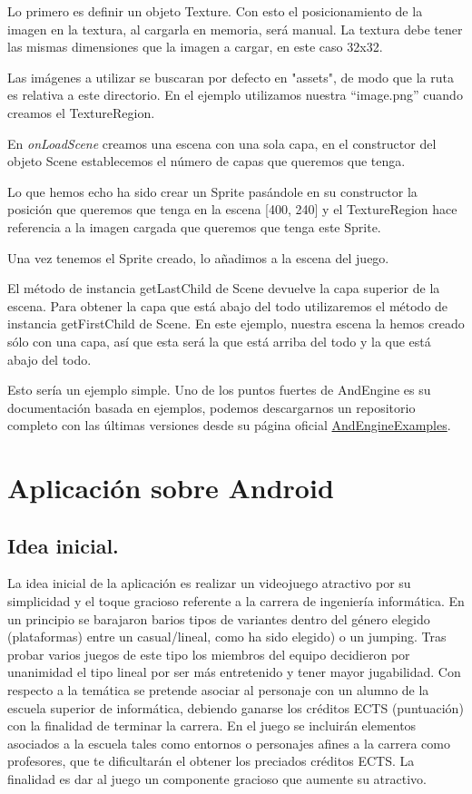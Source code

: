 \documentclass[12 pt, a4paper, twoside]{article}
\begin{document}
\clearpage
Lo primero es definir un objeto Texture. Con esto el posicionamiento
de la imagen en la textura, al cargarla en memoria, será manual.
La textura debe tener las mismas dimensiones que la imagen a cargar,
en este caso 32x32.

Las imágenes a utilizar se buscaran por defecto en "assets", de modo
que la ruta es relativa a este directorio. En el ejemplo utilizamos
nuestra ``image.png'' cuando creamos el TextureRegion.

En \emph{onLoadScene} creamos una escena con una sola capa, en el
constructor del objeto Scene establecemos el número de capas que
queremos que tenga.

Lo que hemos echo ha sido crear un Sprite pasándole en su constructor la posición que
queremos que tenga en la escena [400, 240] y el TextureRegion hace
referencia a la imagen cargada que queremos que tenga este Sprite.

Una vez tenemos el Sprite creado, lo añadimos a la escena del juego.

El método de instancia getLastChild de Scene devuelve la capa superior
de la escena. Para obtener la capa que está abajo del todo
utilizaremos el método de instancia getFirstChild de Scene. En este
ejemplo, nuestra escena la hemos creado sólo con una capa, así que
esta será la que está arriba del todo y la que está abajo del todo.

Esto sería un ejemplo simple. Uno de los puntos fuertes de AndEngine
es su documentación basada en ejemplos, podemos descargarnos un
repositorio completo con las últimas versiones desde su página oficial
\href{http://code.google.com/p/andengineexamples}{AndEngineExamples}.


\section{Aplicación sobre Android}%
\subsection{Idea inicial.}
La idea inicial de la aplicación es realizar un videojuego atractivo
por su simplicidad y el toque gracioso referente a la carrera de
ingeniería informática.
En un principio se barajaron barios tipos de variantes dentro del
género elegido (plataformas) entre un casual/lineal, como ha sido
elegido) o un jumping. Tras probar varios juegos de este tipo los miembros del equipo
decidieron por unanimidad el tipo lineal por ser más entretenido y
tener mayor jugabilidad.
Con respecto a la temática se pretende asociar al personaje con un
alumno de la escuela superior de informática, debiendo ganarse los
créditos ECTS (puntuación) con la finalidad de terminar la carrera. En
el juego se incluirán elementos asociados a la escuela tales
como entornos o personajes afines a la carrera como profesores, que te
dificultarán el obtener los preciados créditos ECTS. La finalidad es
dar al juego un componente gracioso que aumente su atractivo.
\end{document}
